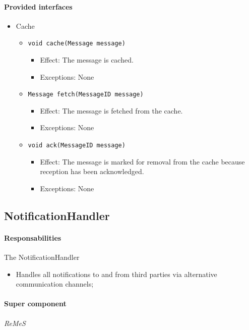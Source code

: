 \documentclass[a4paper,10pt]{article}
\newcommand{\rem}{\emph{ReMeS}\xspace}
\begin{document}
\paragraph{Provided interfaces}
\begin{itemize}
    \item Cache
    \begin{itemize}
    	\item \texttt{void cache(Message message)}
        \begin{itemize}
            \item Effect: The message is cached.
            \item Exceptions: None
        \end{itemize}
        \item \texttt{Message fetch(MessageID message)}
        \begin{itemize}
            \item Effect: The message is fetched from the cache.
            \item Exceptions: None
        \end{itemize}
        \item \texttt{void ack(MessageID message)}
        \begin{itemize}
            \item Effect: The message is marked for removal from the cache because reception has been acknowledged.
            \item Exceptions: None
        \end{itemize}
    \end{itemize}
\end{itemize}

\subsection{NotificationHandler}
\paragraph{Responsabilities} 
The NotificationHandler	
\begin{itemize}
	\item Handles all notifications to and from third parties via alternative communication channels;
\end{itemize}

\paragraph{Super component} \rem
\end{document}
